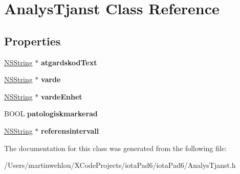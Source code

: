 \hypertarget{interface_analys_tjanst}{
\section{AnalysTjanst Class Reference}
\label{interface_analys_tjanst}
}
\subsection*{Properties}
\begin{DoxyCompactItemize}
\item 
\hypertarget{interface_analys_tjanst_a6c30326e856190ff7a7610a93480835b}{
\hyperlink{class_n_s_string}{NSString} $\ast$ {\bfseries atgardskodText}}
\label{interface_analys_tjanst_a6c30326e856190ff7a7610a93480835b}

\item 
\hypertarget{interface_analys_tjanst_a39d76255b1dff2a8c9f1e9d27c1e98ed}{
\hyperlink{class_n_s_string}{NSString} $\ast$ {\bfseries varde}}
\label{interface_analys_tjanst_a39d76255b1dff2a8c9f1e9d27c1e98ed}

\item 
\hypertarget{interface_analys_tjanst_a22feba5ba1e8ba3823516124dcf5fd9e}{
\hyperlink{class_n_s_string}{NSString} $\ast$ {\bfseries vardeEnhet}}
\label{interface_analys_tjanst_a22feba5ba1e8ba3823516124dcf5fd9e}

\item 
\hypertarget{interface_analys_tjanst_a47f2da76af422e8c2e2d2d6cc28b08f4}{
BOOL {\bfseries patologiskmarkerad}}
\label{interface_analys_tjanst_a47f2da76af422e8c2e2d2d6cc28b08f4}

\item 
\hypertarget{interface_analys_tjanst_a4940958f546b652a237bd2d6d093a0f0}{
\hyperlink{class_n_s_string}{NSString} $\ast$ {\bfseries referensintervall}}
\label{interface_analys_tjanst_a4940958f546b652a237bd2d6d093a0f0}

\end{DoxyCompactItemize}


The documentation for this class was generated from the following file:\begin{DoxyCompactItemize}
\item 
/Users/martinwehlou/XCodeProjects/iotaPad6/iotaPad6/AnalysTjanst.h\end{DoxyCompactItemize}
